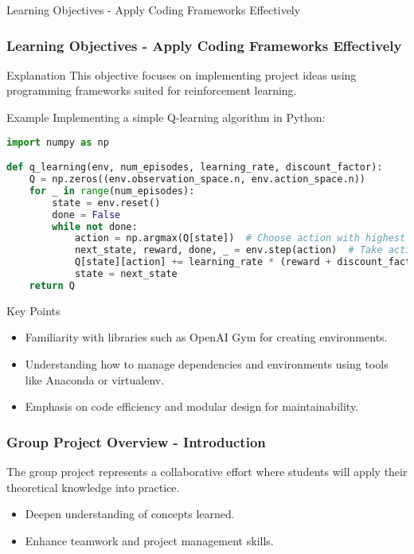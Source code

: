 \documentclass[aspectratio=169]{beamer}
\begin{document}
\begin{frame}[fragile]{Learning Objectives - Apply Coding Frameworks Effectively}
    \frametitle{Learning Objectives - Apply Coding Frameworks Effectively}
    \begin{block}{Explanation}
        This objective focuses on implementing project ideas using programming frameworks suited for reinforcement learning.
    \end{block}
    
    \begin{block}{Example}
        Implementing a simple Q-learning algorithm in Python:
        \begin{lstlisting}[language=Python]
import numpy as np

def q_learning(env, num_episodes, learning_rate, discount_factor):
    Q = np.zeros((env.observation_space.n, env.action_space.n))
    for _ in range(num_episodes):
        state = env.reset()
        done = False
        while not done:
            action = np.argmax(Q[state])  # Choose action with highest Q value
            next_state, reward, done, _ = env.step(action)  # Take action
            Q[state][action] += learning_rate * (reward + discount_factor * np.max(Q[next_state]) - Q[state][action])  # Update Q value
            state = next_state
    return Q
        \end{lstlisting}
    \end{block}

    \begin{block}{Key Points}
        \begin{itemize}
            \item Familiarity with libraries such as OpenAI Gym for creating environments.
            \item Understanding how to manage dependencies and environments using tools like Anaconda or virtualenv.
            \item Emphasis on code efficiency and modular design for maintainability.
        \end{itemize}
    \end{block}
\end{frame}

\begin{frame}[fragile]
    \frametitle{Group Project Overview - Introduction}
    The group project represents a collaborative effort where students will apply their theoretical knowledge into practice. 
    \begin{itemize}
        \item Deepen understanding of concepts learned.
        \item Enhance teamwork and project management skills.
    \end{itemize}
\end{frame}
\end{document}
